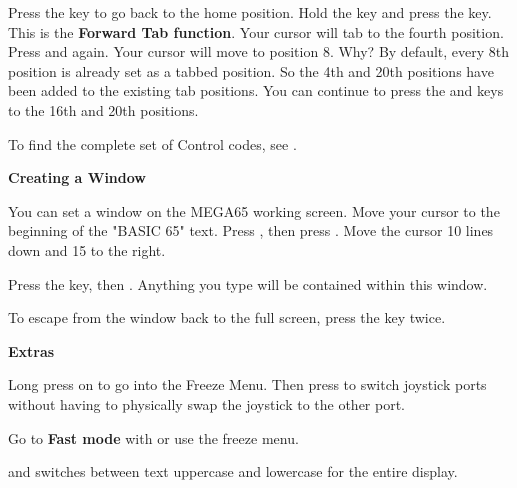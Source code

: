 Press the  key to go back to the home position. Hold the  key and press the  key. This is the \textbf{Forward Tab function}. Your cursor will tab to the fourth position. Press  and  again. Your cursor will move to position 8. Why? By default, every 8th position is already set as a tabbed position. So the 4th and 20th positions have been added to the existing tab positions. You can continue to press the  and  keys to the 16th and 20th positions.

To find the complete set of Control codes, see .

\textbf{Creating a Window}

You can set a window on the MEGA65 working screen. Move your cursor to the beginning of the "BASIC 65" text. Press , then press . Move the cursor 10 lines down and 15 to the right.

Press the  key, then . Anything you type will be contained within this window.

To escape from the window back to the full screen, press the  key twice.


\textbf{Extras}

Long press on  to go into the Freeze Menu.  Then press  to switch joystick ports without having to physically swap the joystick to the other port.

Go to \textbf{Fast mode} with  or use the freeze menu.

\megasymbolkey and  switches between text uppercase and lowercase for the entire display.
